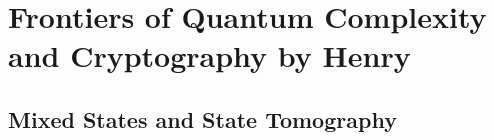 \documentclass[../../note.tex]{subfiles}
\begin{document}
\chapter{Frontiers of Quantum Complexity and Cryptography by Henry}
\section{Mixed States and State Tomography}
\end{document}
